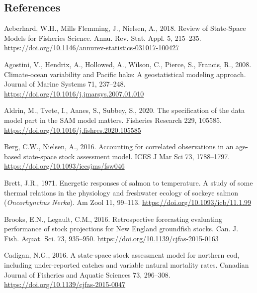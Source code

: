 \documentclass[]{article}
\begin{document}
\hypertarget{references}{%
\subsection*{References}\label{references}}

\hypertarget{refs}{}
\leavevmode\hypertarget{ref-aeberhard2018Review}{}%
Aeberhard, W.H., Mills Flemming, J., Nielsen, A., 2018. Review of
State-Space Models for Fisheries Science. Annu. Rev. Stat. Appl. 5,
215--235. \url{https://doi.org/10.1146/annurev-statistics-031017-100427}

\leavevmode\hypertarget{ref-agostini2008Climateocean}{}%
Agostini, V., Hendrix, A., Hollowed, A., Wilson, C., Pierce, S.,
Francis, R., 2008. Climate-ocean variability and Pacific hake: A
geostatistical modeling approach. Journal of Marine Systems 71,
237--248. \url{https://doi.org/10.1016/j.jmarsys.2007.01.010}

\leavevmode\hypertarget{ref-aldrin2020Specification}{}%
Aldrin, M., Tvete, I., Aanes, S., Subbey, S., 2020. The specification of
the data model part in the SAM model matters. Fisheries Research 229,
105585. \url{https://doi.org/10.1016/j.fishres.2020.105585}

\leavevmode\hypertarget{ref-berg2016Accounting}{}%
Berg, C.W., Nielsen, A., 2016. Accounting for correlated observations in
an age-based state-space stock assessment model. ICES J Mar Sci 73,
1788--1797. \url{https://doi.org/10.1093/icesjms/fsw046}

\leavevmode\hypertarget{ref-brett1971Energetic}{}%
Brett, J.R., 1971. Energetic responses of salmon to temperature. A study
of some thermal relations in the physiology and freshwater ecology of
sockeye salmon (\emph{Oncorhynchus} \emph{Nerka}). Am Zool 11, 99--113.
\url{https://doi.org/10.1093/icb/11.1.99}

\leavevmode\hypertarget{ref-brooks2016Retrospective}{}%
Brooks, E.N., Legault, C.M., 2016. Retrospective forecasting evaluating
performance of stock projections for New England groundfish stocks. Can.
J. Fish. Aquat. Sci. 73, 935--950.
\url{https://doi.org/10.1139/cjfas-2015-0163}

\leavevmode\hypertarget{ref-cadigan2016Statespace}{}%
Cadigan, N.G., 2016. A state-space stock assessment model for northern
cod, including under-reported catches and variable natural mortality
rates. Canadian Journal of Fisheries and Aquatic Sciences 73, 296--308.
\url{https://doi.org/10.1139/cjfas-2015-0047}
\end{document}
